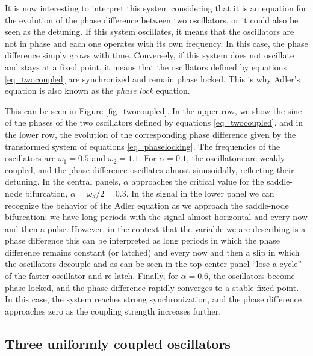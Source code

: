 \documentclass{article}
\begin{document}
\newpage

It is now interesting to interpret this system considering that it is an equation for the evolution of the phase difference between two oscillators, or it could also be seen as the detuning. 
If this system oscillates, it means that the oscillators are not in phase and each one operates with its own frequency. In this case, the phase difference simply grows with time. 
Conversely, if this system does not oscillate and stays at a fixed point, it means that the oscillators defined by equations \ref{eq_twocoupled} are synchronized and remain phase locked. 
This is why Adler's equation is also known as the {\em phase lock} equation.

This can be seen in Figure \ref{fig_twocoupled}. 
In the upper row, we show the sine of the phases of the two oscillators defined by equations \ref{eq_twocoupled}, and in the lower row, the evolution of the corresponding phase difference given by the transformed system of equations \ref{eq_phaselocking}. The frequencies of the oscillators are $\omega_1=0.5$ and $\omega_2=1.1$. 
For $\alpha = 0.1$, the oscillators are weakly coupled, and the phase difference oscillates almost sinusoidally, reflecting their detuning. 
In the central panels, $\alpha$ approaches the critical value for the saddle-node bifurcation, $\alpha = \omega_d/2 = 0.3$. 
In the signal in the lower panel we can recognize the behavior of the Adler equation as we approach the saddle-node bifurcation: we have long periods with the signal almost horizontal and every now and then a pulse. 
However, in the context that the variable we are describing is a phase difference this can be interpreted as long periods in which the phase difference remains constant (or latched) and every now and then a slip in which the oscillators decouple and as can be seen in the top center panel “lose a cycle” of the faster oscillator and re-latch. 
Finally, for $\alpha = 0.6$, the oscillators become phase-locked, and the phase difference rapidly converges to a stable fixed point. In this case, the system reaches strong synchronization, and the phase difference approaches zero as the coupling strength increases further.



\subsection{Three uniformly coupled oscillators}
\end{document}
